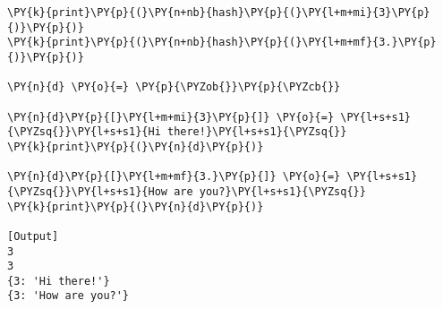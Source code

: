 \begin{Verbatim}[label=\makebox{\url{https://bitbucket.org/lbaldini/programming/src/tip/snippets/dict\_hashing.py}},commandchars=\\\{\}]
\PY{k}{print}\PY{p}{(}\PY{n+nb}{hash}\PY{p}{(}\PY{l+m+mi}{3}\PY{p}{)}\PY{p}{)}
\PY{k}{print}\PY{p}{(}\PY{n+nb}{hash}\PY{p}{(}\PY{l+m+mf}{3.}\PY{p}{)}\PY{p}{)}

\PY{n}{d} \PY{o}{=} \PY{p}{\PYZob{}}\PY{p}{\PYZcb{}}

\PY{n}{d}\PY{p}{[}\PY{l+m+mi}{3}\PY{p}{]} \PY{o}{=} \PY{l+s+s1}{\PYZsq{}}\PY{l+s+s1}{Hi there!}\PY{l+s+s1}{\PYZsq{}}
\PY{k}{print}\PY{p}{(}\PY{n}{d}\PY{p}{)}

\PY{n}{d}\PY{p}{[}\PY{l+m+mf}{3.}\PY{p}{]} \PY{o}{=} \PY{l+s+s1}{\PYZsq{}}\PY{l+s+s1}{How are you?}\PY{l+s+s1}{\PYZsq{}}
\PY{k}{print}\PY{p}{(}\PY{n}{d}\PY{p}{)}

[Output]
3
3
{3: 'Hi there!'}
{3: 'How are you?'}
\end{Verbatim}